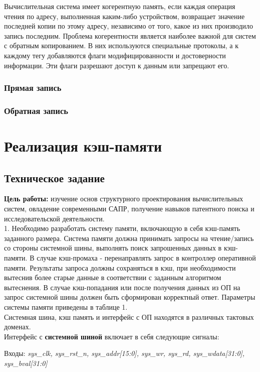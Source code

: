\documentclass[13pt]{article}
\begin{document}
Вычислительная система имеет когерентную память, если каждая операция чтения по адресу, выполненная каким-либо устройством, возвращает значение последней копии по этому адресу, независимо от того, какое из них производило запись последним. Проблема когерентности является наиболее важной для систем с обратным копированием. В них используются специальные протоколы, а к каждому тегу добавляются флаги модифицированности и достоверности информации. Эти флаги разрешают доступ к данным или запрещают его.
	\subsubsection{Прямая запись}
	\subsubsection{Обратная запись}
	\newpage
	\section{Реализация кэш-памяти}
	\subsection{Техническое задание}
	\textbf{Цель работы:} изучение основ структурного проектирования вычислительных систем, овладение современными САПР, получение навыков патентного поиска и исследовательской деятельности.\\
	
	1. Необходимо разработать систему памяти, включающую в себя кэш-память заданного размера. Система памяти должна принимать запросы на чтение/запись со стороны системной шины, выполнять поиск запрошенных данных в кэш-памяти. В случае кэш-промаха - перенаправлять запрос в контроллер оперативной памяти. Результаты запроса должны сохраняться в кэш, при необходимости вытеснив более старые данные в соответствии с заданным алгоритмом вытеснения. В случае кэш-попадания или после получения данных из ОП на запрос системной шины должен быть сформирован корректный ответ. Параметры системы памяти приведены в таблице 1.\\
	Системная шина, кэш память и интерфейс с ОП находятся в различных тактовых доменах.\\
	Интерфейс с \textbf{системной шиной} включает в себя следующие сигналы:
	
	\hspace{5mm}Входы: \textit{sys\_clk, sys\_rst\_n, sys\_addr[15:0], sys\_wr, sys\_rd, sys\_wdata[31:0], sys\_bval[31:0]}
	
\end{document}
